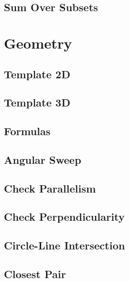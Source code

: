 \subsection{Sum Over Subsets}
\raggedbottom
\hrulefill

\section{Geometry}
\subsection{Template 2D}
\raggedbottom
\hrulefill
\subsection{Template 3D}
\raggedbottom
\hrulefill
\subsection{Formulas}
\raggedbottom
\hrulefill
\subsection{Angular Sweep}
\raggedbottom
\hrulefill
\subsection{Check Parallelism}
\raggedbottom
\hrulefill
\subsection{Check Perpendicularity}
\raggedbottom
\hrulefill
\subsection{Circle-Line Intersection}
\raggedbottom
\hrulefill
\subsection{Closest Pair}
\raggedbottom
\hrulefill

